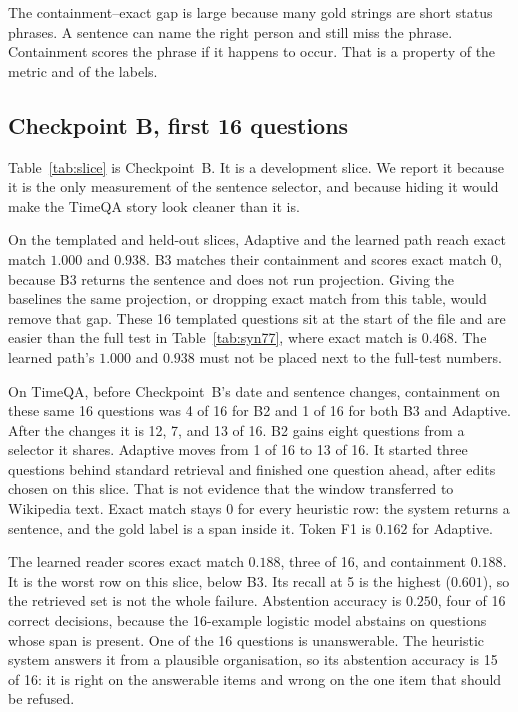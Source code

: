 \documentclass[11pt,letterpaper]{article}
\begin{document}
The containment--exact gap is large because many gold strings are short status phrases.
A sentence can name the right person and still miss the phrase.
Containment scores the phrase if it happens to occur.
That is a property of the metric and of the labels.

\subsection{Checkpoint B, first 16 questions}

Table~\ref{tab:slice} is Checkpoint~B.
It is a development slice.
We report it because it is the only measurement of the sentence selector, and because hiding it would make the TimeQA story look cleaner than it is.

On the templated and held-out slices, Adaptive and the learned path reach exact match $1.000$ and $0.938$.
B3 matches their containment and scores exact match $0$, because B3 returns the sentence and does not run projection.
Giving the baselines the same projection, or dropping exact match from this table, would remove that gap.
These 16 templated questions sit at the start of the file and are easier than the full test in Table~\ref{tab:syn77}, where exact match is $0.468$.
The learned path's $1.000$ and $0.938$ must not be placed next to the full-test numbers.

On TimeQA, before Checkpoint~B's date and sentence changes, containment on these same 16 questions was 4 of 16 for B2 and 1 of 16 for both B3 and Adaptive.
After the changes it is 12, 7, and 13 of 16.
B2 gains eight questions from a selector it shares.
Adaptive moves from 1 of 16 to 13 of 16.
It started three questions behind standard retrieval and finished one question ahead, after edits chosen on this slice.
That is not evidence that the window transferred to Wikipedia text.
Exact match stays $0$ for every heuristic row: the system returns a sentence, and the gold label is a span inside it.
Token F1 is $0.162$ for Adaptive.

The learned reader scores exact match $0.188$, three of 16, and containment $0.188$.
It is the worst row on this slice, below B3.
Its recall at 5 is the highest ($0.601$), so the retrieved set is not the whole failure.
Abstention accuracy is $0.250$, four of 16 correct decisions, because the 16-example logistic model abstains on questions whose span is present.
One of the 16 questions is unanswerable.
The heuristic system answers it from a plausible organisation, so its abstention accuracy is 15 of 16: it is right on the answerable items and wrong on the one item that should be refused.
\end{document}
